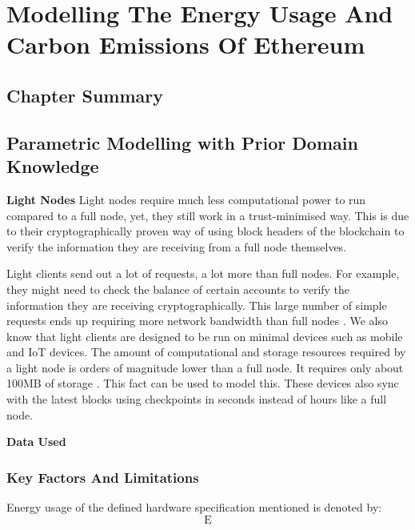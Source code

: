 \chapter{Modelling The Energy Usage And Carbon Emissions Of Ethereum}
\label{Modelling}

\section{Chapter Summary}


\section{Parametric Modelling with Prior Domain Knowledge}

\textbf{Light Nodes}
Light nodes require much less computational power to run compared to a full node, yet, they still work in a trust-minimised way. This is due to their cryptographically proven way of using block headers of the blockchain to verify the information they are receiving from a full 
node themselves. 

Light clients send out a lot of requests, a lot more than full nodes. For example, they might need to check the balance of certain accounts to verify the information they are receiving cryptographically. This large number of simple requests ends up requiring more network bandwidth than full nodes \cite{WhatTechnologies}. We also know that light clients are designed to be run on minimal devices such as mobile and IoT devices. The amount of computational and storage resources required by a light node is orders of magnitude lower than a full node. It requires only about 100MB of storage \cite{WhatTechnologies}. This fact can be used to model this. These devices also sync with the latest blocks using checkpoints in seconds instead of hours like a full node.


\textbf{Data Used}




\subsection {Key Factors And Limitations}


Energy usage of the defined hardware specification mentioned is denoted by:
\begin{equation*}
    \boldsymbol{\mathrm{E}}
\end{equation*} 

